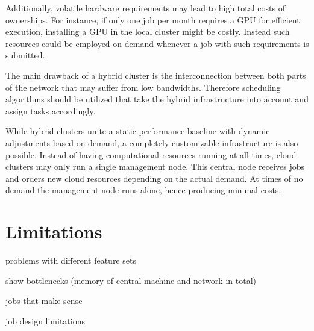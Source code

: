 \begin{description}[style=nextline]
	Additionally, volatile hardware requirements may lead to high total costs of ownerships. For instance, if only one job per month requires a GPU for efficient execution, installing a GPU in the local cluster might be costly. Instead such resources could be employed on demand whenever a job with such requirements is submitted.
	
	The main drawback of a hybrid cluster is the interconnection between both parts of the network that may suffer from low bandwidths. Therefore scheduling algorithms should be utilized that take the hybrid infrastructure into account and assign tasks accordingly.
	
	\item[Cloud Cluster Provider]
	While hybrid clusters unite a static performance baseline with dynamic adjustments based on demand, a completely customizable infrastructure is also possible. Instead of having computational resources running at all times, cloud clusters may only run a single management node. This central node receives jobs and orders new cloud resources depending on the actual demand. At times of no demand the management node runs alone, hence producing minimal costs.
	
	
\end{description}


\section{Limitations}

problems with different feature sets

show bottlenecks (memory of central machine and network in total)

jobs that make sense

job design limitations
